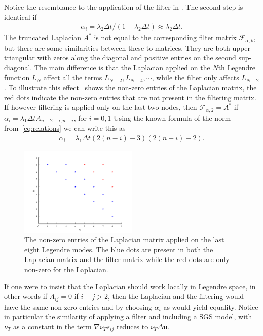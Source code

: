 Notice the resemblance to the application of the filter in . The second step
is identical if 
%
\begin{align}
\alpha_i = \lambda_2\Delta t/(1+\lambda_2\Delta t)\approx \lambda_2\Delta t. 
    \label{eq:alpha1}
\end{align}
%
The truncated Laplacian $A^*$ is not equal to the corresponding
filter matrix $\mathcal{F}_{\alpha,k}$, but there are some similarities between these to matrices.
They are both upper triangular with zeros along the diagonal and positive entries on the second 
sup-diagonal. The main difference is that the Laplacian applied on the $N$th Legendre function 
$L_N$ affect all the terms $L_{N-2},L_{N-4},\cdots$, while the filter only affects $L_{N-2}$.
To illustrate this effect~ shows the non-zero entries of the
Laplacian matrix, the red dots indicate the non-zero entries that are not present in the filtering
matrix. If however filtering is applied only on the last two nodes, then $\mathcal{F}_{\alpha,2} = A^*$ if 
$\alpha_i = \lambda_1\Delta t A_{n-2-i,n-i}$, for $ i = 0,1$ 
Using the known formula of the norm from~\ref{eq:relations} we can write this as 
\begin{align}
\alpha_i = \lambda_1\Delta t (2(n-i)-3)(2(n-i)-2). 
    \label{eq:alpha2}
\end{align}
%
\begin{figure}[h]
	\centering
	\includegraphics[width=0.5\textwidth]{Figures/matrix.png}
	\caption{The non-zero entries of the Laplacian matrix applied on the last eight Legendre modes.
    The blue dots are present in both the Laplacian matrix and the filter matrix
    while the red dots are only non-zero for the Laplacian.}
	\label{fig:entries}
\end{figure}
%
If one were to insist that the Laplacian should work locally in Legendre space, in other words 
if $A_{ij}=0$ if $i-j>2$, then the Laplacian and the filtering would have the same non-zero entries 
and by choosing $\alpha_i$ as would yield equality. Notice in particular the similarity of 
applying a filter and including a SGS model, with $\nu_T$ as a constant in  the term 
$\nabla \nu_Ts_{ij}$ reduces to $\nu_T\Delta \mathbf{u}$.

